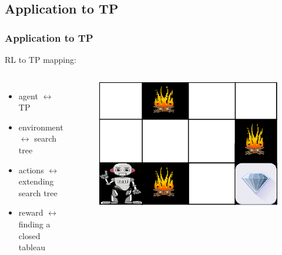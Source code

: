 \documentclass{beamer}
\begin{document}
\subsection{Application to TP}
\begin{frame}
    \frametitle{Application to TP}
    RL to TP mapping:
    \begin{columns}
    \begin{itemize}
        \item agent $\leftrightarrow$ TP
        \item environment $\leftrightarrow$ search tree
        \item actions $\leftrightarrow$ extending search tree
        \item reward $\leftrightarrow$ finding a closed tableau
    \end{itemize}
    \begin{figure}
    \centering
    \includegraphics[width=\textwidth]{RL_robot.png}
    \end{figure}
    \end{columns}
\end{frame}
\end{document}

